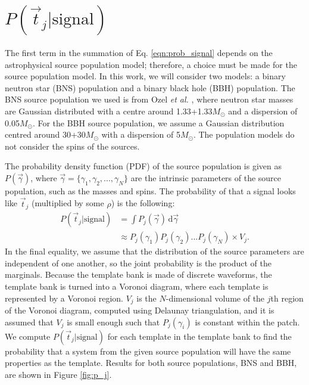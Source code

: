 \documentclass[twocolumn,showpacs,unsortedaddress,superscriptaddress,showkeys,nofootinbib,preprintnumbers,letterpaper]{revtex4-1}
\newcommand*{\diff}{\,\mathrm{d}}
\begin{document}

\section{$P(\vec{t}_j|\text{signal})$} \label{sec:P_j}

The first term in the summation of Eq. \ref{eqn:prob_signal} depends on the astrophysical source population model; therefore, a choice must be made for the source population model. In this work, we will consider two models: a binary neutron star (BNS) population and a binary black hole (BBH) population. The BNS source population we used is from Ozel {\it et al.} \cite{Ozel:2012ax}, where neutron star masses are Gaussian distributed with a centre around 1.33+1.33$M_\odot$ and a dispersion of 0.05$M_\odot$. For the BBH source population, we assume a Gaussian distribution centred around 30+30$M_{\odot}$ with a dispersion of 5$M_\odot$. The population models do not consider the spins of the sources.

The probability density function (PDF) of the source population is given as $P(\vec{\gamma})$, where $\vec{\gamma}=\{\gamma_1,\gamma_2,..., \gamma_N\}$ are the intrinsic parameters of the source population, such as the masses and spins. The probability of that a signal looks like $\vec{t}_j$ (multiplied by some $\rho$) is the following:
	\begin{align}
	P(\vec{t}_j|\text{signal}) &= \int P_j(\vec{\gamma}) \diff\vec{\gamma} \\
	&\approx P_j(\gamma_1) P_j(\gamma_2)...P_j(\gamma_N) \times V_j.
	\end{align}
In the final equality, we assume that the distribution of the source parameters are independent of one another, so the joint probability is the product of the marginals. Because the template bank is made of discrete waveforms, the template bank is turned into a Voronoi diagram, where each template is represented by a Voronoi region. $V_j$ is the $N$-dimensional volume of the $j$th region of the Voronoi diagram, computed using Delaunay triangulation, and it is assumed that $V_j$ is small enough such that $P_j(\gamma_i)$ is constant within the patch. We compute $P(\vec{t}_j|\text{signal})$ for each template in the template bank to find the probability that a system from the given source population will have the same properties as the template. Results for both source populations, BNS and BBH, are shown in Figure \ref{fig:p_j}.
\end{document}
